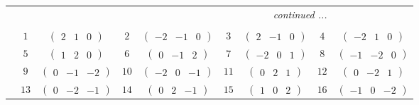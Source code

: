 \documentclass[fleqn,10pt,landscape]{article}
\begin{document}
\begin{itemize}
{\begin{center}
\begin{longtable}{ccccccccc}
 \hline \hline
\multicolumn{8}{r}{\footnotesize\it continued ...} \\ \endfoot

 \hline \hline
\multicolumn{8}{r}{} \\ \endlastfoot

 & $ 1 $ & $ \begin{pmatrix} 2 & 1 & 0 \end{pmatrix} $ & $ 2 $ & $ \begin{pmatrix} -2 & -1 & 0 \end{pmatrix} $ & $ 3 $ & $ \begin{pmatrix} 2 & -1 & 0 \end{pmatrix} $ & $ 4 $ & $ \begin{pmatrix} -2 & 1 & 0 \end{pmatrix} $ \\
& $ 5 $ & $ \begin{pmatrix} 1 & 2 & 0 \end{pmatrix} $ & $ 6 $ & $ \begin{pmatrix} 0 & -1 & 2 \end{pmatrix} $ & $ 7 $ & $ \begin{pmatrix} -2 & 0 & 1 \end{pmatrix} $ & $ 8 $ & $ \begin{pmatrix} -1 & -2 & 0 \end{pmatrix} $ \\
& $ 9 $ & $ \begin{pmatrix} 0 & -1 & -2 \end{pmatrix} $ & $ 10 $ & $ \begin{pmatrix} -2 & 0 & -1 \end{pmatrix} $ & $ 11 $ & $ \begin{pmatrix} 0 & 2 & 1 \end{pmatrix} $ & $ 12 $ & $ \begin{pmatrix} 0 & -2 & 1 \end{pmatrix} $ \\
& $ 13 $ & $ \begin{pmatrix} 0 & -2 & -1 \end{pmatrix} $ & $ 14 $ & $ \begin{pmatrix} 0 & 2 & -1 \end{pmatrix} $ & $ 15 $ & $ \begin{pmatrix} 1 & 0 & 2 \end{pmatrix} $ & $ 16 $ & $ \begin{pmatrix} -1 & 0 & -2 \end{pmatrix} $ \\

\end{longtable}
\end{center}}
\end{itemize}
\end{document}
